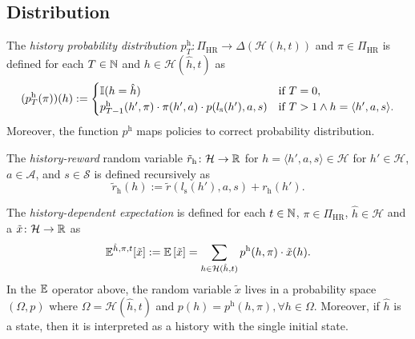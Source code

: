 \subsection{Distribution}


\begin{definition}\label{def:hist-dist}
The \emph{history probability distribution} $p^{\mathrm{h}}_T \colon  \Pi_{\mathrm{HR}} \to \Delta(\mathcal{H}(h,t))$  and $\pi \in \Pi_{\mathrm{HR}}$ is defined for each $T \in \mathbb{N}$ and $h\in \mathcal{H}(\hat{h},t)$ as
\[
(p^{\mathrm{h}}_T(\pi))(h) :=
\begin{cases}
\mathbb{I}(h = \hat{h}) &\text{if } T = 0, \\
p_{T-1}^{\mathrm{h}}(h', \pi) \cdot \pi(h',a) \cdot  p(l_{\mathrm{s}}(h'), a , s) &\text{if } T > 1 \wedge h = \langle h', a, s \rangle.
\end{cases}
\]
Moreover, the function $p^{\mathrm{h}}$ maps policies to correct probability distribution.
 \leanok
\end{definition}

\begin{definition} \label{def:reward}
The \emph{history-reward} random variable $\tilde{r}_{\mathrm{h}}\colon \mathcal{H} \to \mathbb{R}$ for $h = \langle h', a, s \rangle \in  \mathcal{H}$ for $h'\in \mathcal{H}$, $a\in \mathcal{A}$, and $s\in \mathcal{S}$ is defined recursively as
\[
\tilde{r}_{\mathrm{h}}(h) := \tilde{r}(l_{\mathrm{s}}(h'), a, s) + r_{\mathrm{h}}(h').
\]
 \leanok
\end{definition}


\begin{definition}\label{def:expect-h}
The \emph{history-dependent expectation} is defined for each $t\in \mathbb{N}$, $\pi\in \Pi_{\mathrm{HR}}$, $\hat{h}\in \mathcal{H}$ and a $\tilde{x}\colon \mathcal{H} \to \mathbb{R}$ as
\begin{equation*}
\mathbb{E}^{\hat{h}, \pi, t} [\tilde{x}]
:= \mathbb{E} \left[ \tilde{x} \right] 
= \sum_{h \in \mathcal{H}(\hat{h}, t)} p^{\mathrm{h}}(h, \pi) \cdot \tilde{x}(h).
\end{equation*}
In the $\mathbb{E}$ operator above, the random variable $\tilde{x}$ lives in a probability space $(\Omega, p)$ where $\Omega = \mathcal{H}(\hat{h}, t)$ and $p(h) = p^{\mathrm{h}}(h, \pi), \forall h\in \Omega$.
Moreover, if $\hat{h}$ is a state, then it is interpreted as a history with the single initial state.
 \leanok
\end{definition}


